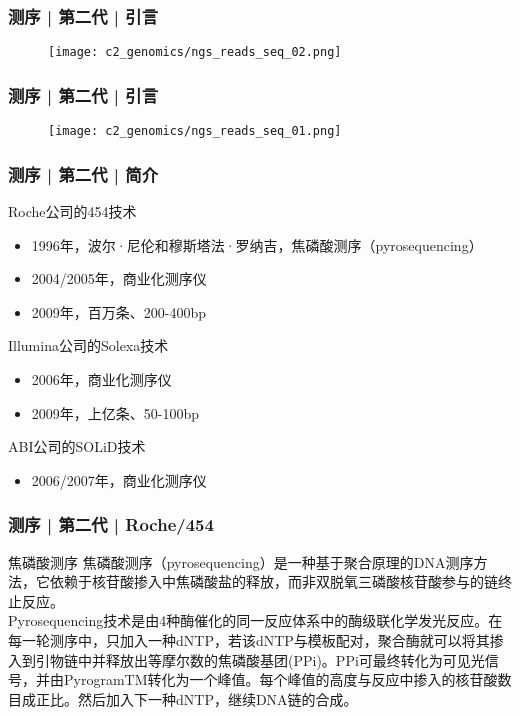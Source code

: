 \begin{frame}
  \frametitle{测序 | 第二代 | 引言}
  \begin{figure}
    \centering
    \texttt{[image: c2\_genomics/ngs\_reads\_seq\_02.png]}
  \end{figure}
\end{frame}

\begin{frame}
  \frametitle{测序 | 第二代 | 引言}
  \begin{figure}
    \centering
    \texttt{[image: c2\_genomics/ngs\_reads\_seq\_01.png]}
  \end{figure}
\end{frame}

\begin{frame}
  \frametitle{测序 | 第二代 | 简介}
  \begin{block}{Roche公司的454技术}
  \begin{itemize}
    \item 1996年，波尔·尼伦和穆斯塔法·罗纳吉，焦磷酸测序（pyrosequencing）
    \item 2004/2005年，商业化测序仪
    \item 2009年，百万条、200-400bp
  \end{itemize}
  \end{block}
  \pause
  \begin{block}{Illumina公司的Solexa技术}
  \begin{itemize}
    \item 2006年，商业化测序仪
    \item 2009年，上亿条、50-100bp
  \end{itemize}
  \end{block}
  \pause
  \begin{block}{ABI公司的SOLiD技术}
  \begin{itemize}
    \item 2006/2007年，商业化测序仪
  \end{itemize}
  \end{block}
\end{frame}

\begin{frame}
  \frametitle{测序 | 第二代 | Roche/454}
  \begin{block}{焦磷酸测序}
焦磷酸测序（pyrosequencing）是一种基于聚合原理的DNA测序方法，它依赖于核苷酸掺入中焦磷酸盐的释放，而非双脱氧三磷酸核苷酸参与的链终止反应。\\
\vspace{1em}
Pyrosequencing技术是由4种酶催化的同一反应体系中的酶级联化学发光反应。在每一轮测序中，只加入一种dNTP，若该dNTP与模板配对，聚合酶就可以将其掺入到引物链中并释放出等摩尔数的焦磷酸基团(PPi)。PPi可最终转化为可见光信号，并由PyrogramTM转化为一个峰值。每个峰值的高度与反应中掺入的核苷酸数目成正比。然后加入下一种dNTP，继续DNA链的合成。
  \end{block}
\end{frame}

